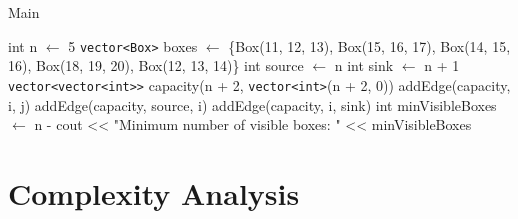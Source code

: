 \documentclass{article}
\begin{document}
    \begin{algorithm}[2]
    \caption{Main}
        \begin{algorithmic}[1]
                \State int n $\gets$ 5  
                \State \texttt{vector<Box>} boxes $\gets$ \{Box(11, 12, 13), Box(15, 16, 17), Box(14, 15, 16), Box(18, 19, 20), Box(12, 13, 14)\}  
                \State int source $\gets$ n  
                \State int sink $\gets$ n + 1  
                \State \texttt{vector<vector<int>>} capacity(n + 2, \texttt{vector<int>}(n + 2, 0))  
                            \State addEdge(capacity, i, j)  
                        \EndIf
                    \EndFor
                \EndFor
                    \State addEdge(capacity, source, i)  
                    \State addEdge(capacity, i, sink)  
                \EndFor
                \State int minVisibleBoxes $\gets$ n -   
                \State cout << "Minimum number of visible boxes: " << minVisibleBoxes  
            \EndFunction
        \end{algorithmic}
    \end{algorithm}

\section{Complexity Analysis}
\end{document}

